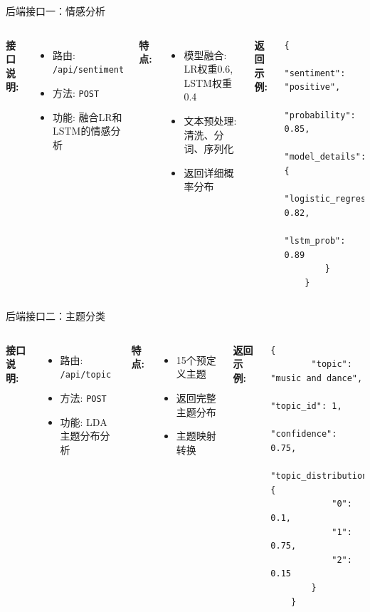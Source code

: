 \documentclass{beamer}
\begin{document}
\begin{frame}[fragile]{后端接口一：情感分析}
    \begin{columns}
        \textbf{接口说明:}
        \begin{itemize}
            \item 路由: \texttt{/api/sentiment}
            \item 方法: \texttt{POST}
            \item 功能: 融合LR和LSTM的情感分析
        \end{itemize}
        \vspace{0.2cm}
        \textbf{特点:}
        \begin{itemize}
            \item 模型融合: LR权重0.6, LSTM权重0.4
            \item 文本预处理: 清洗、分词、序列化
            \item 返回详细概率分布
        \end{itemize}

        \textbf{返回示例:}
        \begin{lstlisting}[style=pythonstyle, basicstyle=\tiny]
    {
        "sentiment": "positive",
        "probability": 0.85,
        "model_details": {
            "logistic_regression_prob": 0.82,
            "lstm_prob": 0.89
        }
    }
        \end{lstlisting}
    \end{columns}
\end{frame}

\begin{frame}[fragile]{后端接口二：主题分类}
    \begin{columns}
        \textbf{接口说明:}
        \begin{itemize}
            \item 路由: \texttt{/api/topic}
            \item 方法: \texttt{POST}
            \item 功能: LDA主题分布分析
        \end{itemize}
        \vspace{0.2cm}
        \textbf{特点:}
        \begin{itemize}
            \item 15个预定义主题
            \item 返回完整主题分布
            \item 主题映射转换
        \end{itemize}

        \textbf{返回示例:}
        \begin{lstlisting}[style=pythonstyle, basicstyle=\tiny]
    {
        "topic": "music and dance",
        "topic_id": 1,
        "confidence": 0.75,
        "topic_distribution": {
            "0": 0.1,
            "1": 0.75,
            "2": 0.15
        }
    }
        \end{lstlisting}
    \end{columns}
\end{frame}
\end{document}
